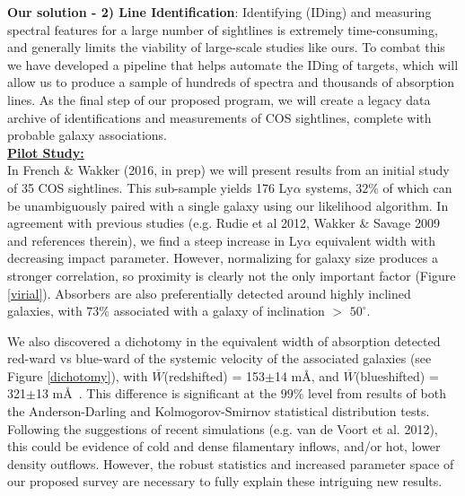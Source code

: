 \documentclass[12pt]{article}
\begin{document}

\textbf{Our solution - 2) Line Identification}: Identifying (IDing) and measuring spectral features for a large number of sightlines is extremely time-consuming, and generally limits the viability of large-scale studies like ours. To combat this we have developed a pipeline that helps automate the IDing of targets, which will allow us to produce a sample of hundreds of spectra and thousands of absorption lines. As the final step of our proposed program, we will create a legacy data archive of identifications and measurements of COS sightlines, complete with probable galaxy associations.\\

\noindent \textbf{\underline{Pilot Study:}}\\
\indent In French $\&$ Wakker (2016, in prep) we will present results from an initial study of 35 COS sightlines. This sub-sample yields 176 Ly$\alpha$ systems, $32\%$ of which can be unambiguously paired with a single galaxy using our likelihood algorithm. In agreement with previous studies (e.g. Rudie et al 2012, Wakker $\&$ Savage 2009 and references therein), we find a steep increase in Ly$\alpha$ equivalent width with decreasing impact parameter. However, normalizing for galaxy size produces a stronger correlation, so proximity is clearly not the only important factor (Figure \ref{virial}). Absorbers are also preferentially detected around highly inclined galaxies, with $73\%$ associated with a galaxy of inclination $>$ $50^{\circ}$. 

We also discovered a dichotomy in the equivalent width of absorption detected red-ward vs blue-ward of the systemic velocity of the associated galaxies (see Figure \ref{dichotomy}), with $\overline{W}$(redshifted) = 153$\pm$14 m\AA, and $\overline{W}$(blueshifted) = 321$\pm$13 m\AA~. This difference is significant at the $99\%$ level from results of both the Anderson-Darling and Kolmogorov-Smirnov statistical distribution tests. Following the suggestions of recent simulations (e.g. van de Voort et al. 2012), this could be evidence of cold and dense filamentary inflows, and/or hot, lower density outflows. However, the robust statistics and increased parameter space of our proposed survey are necessary to fully explain these intriguing new results.\\
\end{document}

